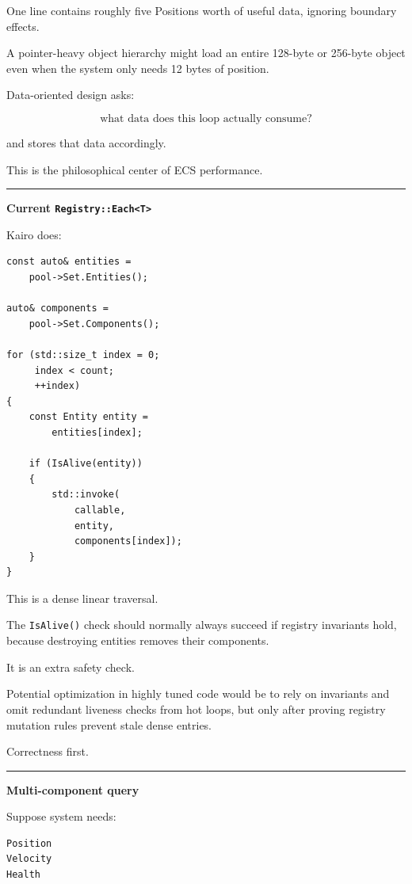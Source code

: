 One line contains roughly five Positions worth of useful data, ignoring boundary effects.

A pointer-heavy object hierarchy might load an entire 128-byte or 256-byte object even when the system only needs 12 bytes of position.

Data-oriented design asks:

\[
\boxed{
\text{what data does this loop actually consume?}
}
\]

and stores that data accordingly.

This is the philosophical center of ECS performance.

\begin{center}\rule{0.5\linewidth}{0.5pt}\end{center}

\textbf{Current \texttt{Registry::Each\textless{}T\textgreater{}}}

Kairo does:

\begin{verbatim}
const auto& entities =
    pool->Set.Entities();

auto& components =
    pool->Set.Components();

for (std::size_t index = 0;
     index < count;
     ++index)
{
    const Entity entity =
        entities[index];

    if (IsAlive(entity))
    {
        std::invoke(
            callable,
            entity,
            components[index]);
    }
}
\end{verbatim}

This is a dense linear traversal.

The \texttt{IsAlive()} check should normally always succeed if registry invariants hold, because destroying entities removes their components.

It is an extra safety check.

Potential optimization in highly tuned code would be to rely on invariants and omit redundant liveness checks from hot loops, but only after proving registry mutation rules prevent stale dense entries.

Correctness first.

\begin{center}\rule{0.5\linewidth}{0.5pt}\end{center}

\textbf{Multi-component query}

Suppose system needs:

\begin{verbatim}
Position
Velocity
Health
\end{verbatim}

